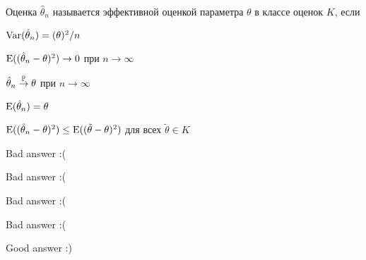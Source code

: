 
\begin{question}
Оценка \(\hat \theta_n\) называется эффективной оценкой параметра
\(\theta\) в классе оценок \(K\), если
\begin{answerlist}[2]
  \item \(\Var(\hat \theta_n)=(\theta)^2/n\)
  \item \(\E((\hat \theta_n - \theta)^2) \stackrel{}{\to} 0\) при
\(n\stackrel{}{\to} \infty\)
  \item \(\hat \theta_n \stackrel{\P}{\to} \theta\) при
\(n\stackrel{}{\to} \infty\)
  \item \(\E(\hat \theta_n)=\theta\)
  \item \(\E((\hat \theta_n - \theta)^2) \leq \E((\tilde \theta - \theta)^2)\)
для всех \(\tilde \theta \in K\)
\end{answerlist}
\end{question}

\begin{solution}
\begin{answerlist}
  \item Bad answer :(
  \item Bad answer :(
  \item Bad answer :(
  \item Bad answer :(
  \item Good answer :)
\end{answerlist}
\end{solution}

